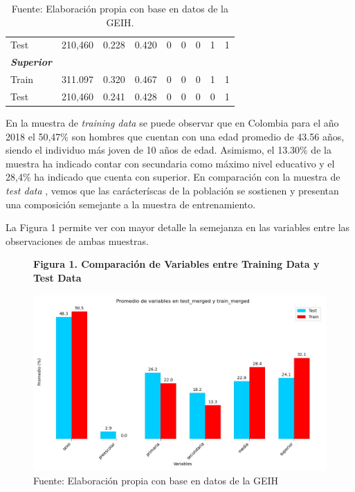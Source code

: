 \documentclass[11pt, a4paper]{article}
\begin{document}
\begin{table}[ht]
\begin{tabular}{l c c c c c c c c}
    \hspace{10pt} Test  & 210,460 & 0.228 & 0.420 & 0 & 0 & 0 & 1 & 1 \\
    \textbf{\textit{Superior}} & & & & & & & & \\
    \hspace{10pt} Train &  311.097 & 0.320 & 0.467 & 0 & 0 & 0 & 1 & 1\\
    \hspace{10pt} Test  & 210,460 & 0.241 & 0.428 & 0 & 0 & 0 & 0 & 1 \\
    \bottomrule
    \end{tabular}
    \caption*{\small Fuente: Elaboración propia con base en datos de la GEIH.}
\end{table}

En la muestra de \textit{training data } se puede observar que en Colombia para el año 2018 el 50,47\%  son hombres que cuentan con una edad promedio de 43.56 años, siendo el individuo más joven de 10 años de edad. Asimismo, el 13.30\% de la muestra ha indicado contar con secundaria como máximo nivel educativo y el 28,4\% ha indicado que cuenta con superior. 
En comparación con la muestra de  \textit{test data }, vemos que las carácteríscas de la población se sostienen y presentan una composición semejante a la muestra de entrenamiento.

La Figura 1 permite ver con mayor detalle la semejanza en las variables entre las observaciones de ambas muestras. 

\begin{figure}[H]
   \centering
	\caption*{\textbf{Figura 1. Comparación de Variables entre Training Data y Test Data}}
  	\captionsetup{justification=centering}
  	\includegraphics[width=16cm]{../Views/Grafico1.jpeg}
	\caption*{\small Fuente: Elaboración propia con base en datos de la GEIH }
\end{figure} 
\end{document}

